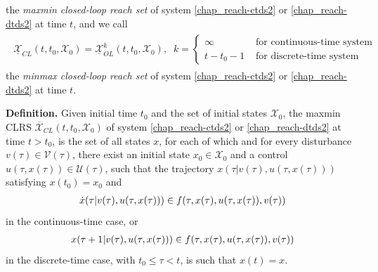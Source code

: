 \documentclass[letterpaper,10pt,english]{sphinxmanual}
\begin{document}
the \emph{maxmin closed-loop reach set} of system \eqref{chap_reach-ctds2} or \eqref{chap_reach-dtds2} at
time \(t\), and we call
\label{chap_reach:equation-minmaxclrs}\begin{gather}
\begin{split}\underline{{\mathcal X}}_{CL}(t, t_0, {\mathcal X}_0) = \underline{{\mathcal X}}_{OL}^k(t, t_0, {\mathcal X}_0), \;\;
k = \left\{\begin{array}{ll}
\infty & \mbox{ for continuous-time system}\\
t-t_0-1 & \mbox{ for discrete-time system}\end{array}\right.\end{split}\label{chap_reach-minmaxclrs}
\end{gather}
the \emph{minmax closed-loop reach set} of system \eqref{chap_reach-ctds2} or \eqref{chap_reach-dtds2} at
time \(t\).

\textbf{Definition.} Given initial time \(t_0\) and the set of initial
states \({\mathcal X}_0\), the maxmin CLRS
\(\overline{{\mathcal X}}_{CL}(t, t_0, {\mathcal X}_0)\) of system
\eqref{chap_reach-ctds2} or \eqref{chap_reach-dtds2} at time \(t>t_0\), is the set of all states
\(x\), for each of which and for every disturbance
\(v(\tau)\in{\mathcal V}(\tau)\), there exist an initial state
\(x_0\in{\mathcal X}_0\) and a control
\(u(\tau, x(\tau))\in{\mathcal U}(\tau)\), such that the trajectory
\(x(\tau | v(\tau), u(\tau, x(\tau)))\) satisfying
\(x(t_0) = x_0\) and
\begin{gather}
\begin{split}\dot{x}(\tau | v(\tau), u(\tau, x(\tau))) \in
f(\tau, x(\tau), u(\tau, x(\tau)), v(\tau))\end{split}\notag
\end{gather}
in the continuous-time case, or
\begin{gather}
\begin{split}x(\tau+1 | v(\tau), u(\tau, x(\tau))) \in
f(\tau, x(\tau), u(\tau, x(\tau)), v(\tau))\end{split}\notag
\end{gather}
in the discrete-time case, with \(t_0\leqslant\tau<t\), is such
that \(x(t)=x\).
\end{document}

